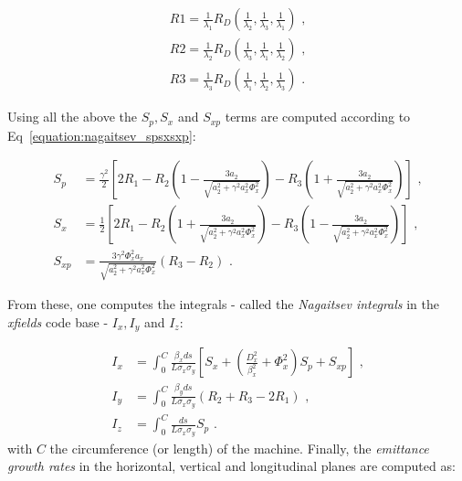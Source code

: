 \begin{equation}
    \begin{aligned}
        R1 = \frac{1}{\lambda_1} R_D(\frac{1}{\lambda_2}, \frac{1}{\lambda_3}, \frac{1}{\lambda_1}) \text{ ,} \\
        R2 = \frac{1}{\lambda_2} R_D(\frac{1}{\lambda_3}, \frac{1}{\lambda_1}, \frac{1}{\lambda_2}) \text{ ,} \\
        R3 = \frac{1}{\lambda_3} R_D(\frac{1}{\lambda_1}, \frac{1}{\lambda_2}, \frac{1}{\lambda_3}) \text{ .}
    \end{aligned}
    \label{equation:nagaitsev_r1r2r3}
\end{equation}

Using all the above the \(S_p, S_x\) and \(S_{xp}\) terms are computed according to Eq~\eqref{equation:nagaitsev_spsxsxp}:

\begin{equation}
    \begin{aligned}
        S_p &= \frac{\gamma^2}{2} \left[ 2 R_1 - R_2 \left(1 - \frac{3 a_2}{\sqrt{a_2^{2} + \gamma^2 a_x^{2} \Phi_x^2}}\right) - R_3 \left(1 + \frac{3 a_2}{\sqrt{a_2^{2} + \gamma^2 a_x^{2} \Phi_x^2}}\right) \right] \text{ ,} \\
        S_x &= \frac{1}{2} \left[ 2 R_1 - R_2 \left(1 + \frac{3 a_2}{\sqrt{a_2^{2} + \gamma^2 a_x^{2} \Phi_x^2}}\right) - R_3 \left(1 - \frac{3 a_2}{\sqrt{a_2^{2} + \gamma^2 a_x^{2} \Phi_x^2}}\right) \right] \text{ ,} \\
        S_{xp} &= \frac{3 \gamma^2 \Phi_x^2 a_x}{\sqrt{a_2^{2} + \gamma^2 a_x^{2} \Phi_x^2}} \left( R_3 - R_2 \right) \text{ .}
    \end{aligned}
    \label{equation:nagaitsev_spsxsxp}
\end{equation}

From these, one computes the integrals - called the \textit{Nagaitsev integrals} in the \textit{xfields} code base - \(I_x, I_y\) and \(I_z\):

\begin{equation}
    \begin{aligned}
        I_x &= \int_0^C \frac{\beta_x ds}{L \sigma_x \sigma_y} \left[S_x + \left( \frac{D_x^{2}}{\beta_x^{2}} + \Phi_x^{2} \right) S_p + S_{xp} \right] \text{ ,} \\
        I_y &= \int_0^C \frac{\beta_y ds}{L \sigma_x \sigma_y} \left(R_2 + R_3 - 2 R_1\right) \text{ ,} \\
        I_z &= \int_0^C \frac{ds}{L \sigma_x \sigma_y} S_p \text{ .}
    \end{aligned}
    \label{equation:nagaitsev_integrals}
\end{equation}
with \(C\) the circumference (or length) of the machine.
Finally, the \textit{emittance growth rates} in the horizontal, vertical and longitudinal planes are computed as:

